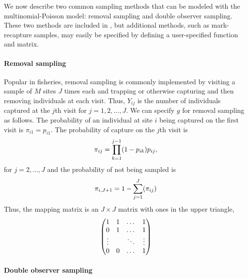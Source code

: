 \documentclass[article,shortnames]{jss}
\newcommand{\um}{\pkg{unmarked}}
\begin{document}
We now describe two common sampling methods that can be modeled
with the multinomial-Poisson model: removal sampling and double
observer sampling.  These two methods are included in \um, but
additional methods, such as mark-recapture samples, may easily be specified
by defining a user-specified  function and  matrix.

\paragraph{Removal sampling }

Popular in fisheries, removal sampling is commonly implemented by
visiting a sample of $M$ sites $J$ times each and trapping or
otherwise capturing and then removing individuals at each visit.  Thus,
$Y_{ij}$ is the number of individuals captured at the $j$th visit for
$j=1,2,\dots,J$. We can specify $g$ for removal sampling as follows.  The
probability of an individual at site $i$ being captured on the first
visit is $\pi_{i1} = p_{i1}$.  The probability of capture on the $j$th
visit is
\begin{equation}
  \pi_{ij} = \prod_{k=1}^{j-1}(1 - p_{ik})p_{ij}, \notag
\end{equation}
for $j=2,\dots,J$ and the probability of not being sampled is
\begin{equation}
  \pi_{i,J+1} = 1 - \sum_{j=1}^{J}(\pi_{ij}) \notag
\end{equation}
Thus, the mapping matrix is an $J \times J$  matrix with ones in
the upper triangle,
\begin{equation}
  \begin{pmatrix}
    1 & 1 & \dots & 1 \\
    0 & 1 & \dots & 1 \\
    \vdots & & \ddots & \vdots \\
    0 & 0 & \dots  & 1 \notag
  \end{pmatrix}
\end{equation}


\paragraph{Double observer sampling}
\label{sec:double-observ-sampl}
\end{document}
